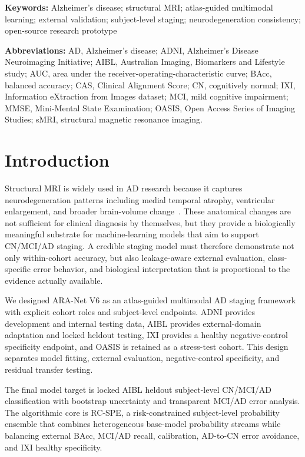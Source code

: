 \vspace{0.5em}
\noindent\textbf{Keywords:} Alzheimer's disease; structural MRI; atlas-guided multimodal learning; external validation; subject-level staging; neurodegeneration consistency; open-source research prototype

\vspace{0.5em}
\noindent\textbf{Abbreviations:} AD, Alzheimer's disease; ADNI, Alzheimer's Disease Neuroimaging Initiative; AIBL, Australian Imaging, Biomarkers and Lifestyle study; AUC, area under the receiver-operating-characteristic curve; BAcc, balanced accuracy; CAS, Clinical Alignment Score; CN, cognitively normal; IXI, Information eXtraction from Images dataset; MCI, mild cognitive impairment; MMSE, Mini-Mental State Examination; OASIS, Open Access Series of Imaging Studies; sMRI, structural magnetic resonance imaging.


\section{Introduction}
\label{sec:intro}

Structural MRI is widely used in AD research because it captures neurodegeneration patterns including medial temporal atrophy, ventricular enlargement, and broader brain-volume change~\citep{jack2018nia,frisoni2010neuroimaging}. These anatomical changes are not sufficient for clinical diagnosis by themselves, but they provide a biologically meaningful substrate for machine-learning models that aim to support CN/MCI/AD staging. A credible staging model must therefore demonstrate not only within-cohort accuracy, but also leakage-aware external evaluation, class-specific error behavior, and biological interpretation that is proportional to the evidence actually available.

We designed ARA-Net V6 as an atlas-guided multimodal AD staging framework with explicit cohort roles and subject-level endpoints. ADNI provides development and internal testing data, AIBL provides external-domain adaptation and locked heldout testing, IXI provides a healthy negative-control specificity endpoint, and OASIS is retained as a stress-test cohort. This design separates model fitting, external evaluation, negative-control specificity, and residual transfer testing.

The final model target is locked AIBL heldout subject-level CN/MCI/AD classification with bootstrap uncertainty and transparent MCI/AD error analysis. The algorithmic core is RC-SPE, a risk-constrained subject-level probability ensemble that combines heterogeneous base-model probability streams while balancing external BAcc, MCI/AD recall, calibration, AD-to-CN error avoidance, and IXI healthy specificity.

